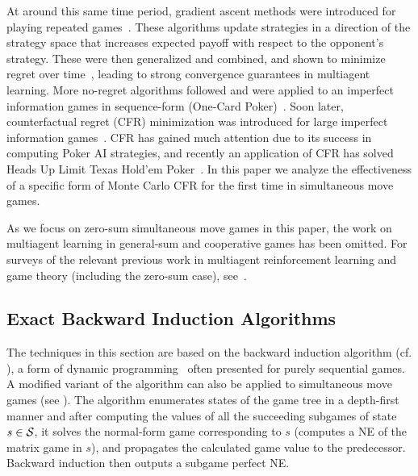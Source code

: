 At around this same time period, gradient ascent methods were introduced for playing 
repeated games~\cite{Singh20Nash,Bowling01WoLF}. These algorithms update strategies in a direction of the strategy space 
that increases expected payoff with respect to the opponent's strategy. These were then generalized and combined, and 
shown to minimize regret over time~\cite{Zinkevich03Online,Bowling05Convergence}, leading to strong convergence 
guarantees in multiagent learning. More no-regret algorithms followed and were applied to an imperfect information 
games in sequence-form (One-Card Poker)~\cite{Gordon06No}. Soon later, counterfactual regret (CFR) minimization was 
introduced for large imperfect information games~\cite{CFR}. CFR has gained much attention due to its success in 
computing Poker AI strategies, and recently an application of CFR has solved Heads Up Limit Texas Hold'em Poker~\cite{Bowling15science}.
In this paper we analyze the effectiveness of a specific form of Monte Carlo CFR for the first time in simultaneous move games. 

As we focus on zero-sum simultaneous move games in this paper, the work on multiagent learning in general-sum and 
cooperative games has been omitted. For surveys of the relevant previous work in multiagent 
reinforcement learning and game theory (including the zero-sum case), 
see~\cite{Nowe12MARLchapter,Busoniu08Comprehensive,Bloembergen15Evolutionary}.

\subsection{Exact Backward Induction Algorithms}

The techniques in this section are based on the backward induction algorithm (cf. \cite{Shoham09}), 
a form of dynamic programming~\cite{Bellman57} often presented for purely sequential games. 
A modified variant of the algorithm can also be applied to simultaneous move 
games (\eg see \cite{Ross71Goofspiel,buro2003,Rhoads12Computer}). 
The algorithm enumerates states of the game tree in a depth-first manner and after computing the values of all the succeeding subgames of state $s \in \mathcal{S}$, 
it solves the normal-form game corresponding to $s$ (\ie computes a NE of the matrix game in $s$), and propagates the calculated game value to the predecessor.
Backward induction then outputs a subgame perfect NE. 

